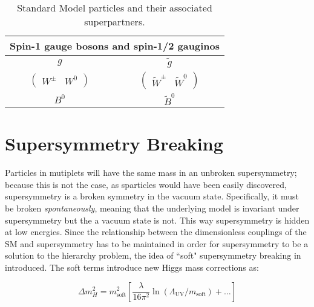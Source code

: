 \begin{table}[!htb]
\begin{tabular}{c|c}
		\hline\hline
		\multicolumn{5}{c}{Spin-1 gauge bosons and spin-1/2 gauginos} \\
		\hline
		$g$											& $\tilde{g}$											\\%
		$\begin{pmatrix} W^{\pm}&W^0\end{pmatrix}$	& $\begin{pmatrix} \widetilde{W}^{\pm}&\widetilde{W}^0\end{pmatrix}$						\\%
		$B^0$											& $\widetilde{B}^0$												\\%
		\hline\hline
	\end{tabular}
	\caption{Standard Model particles and their associated superpartners.}
	\label{tab:smsusypartners}
\end{table}


\section{Supersymmetry Breaking}

Particles in mutiplets will have the same mass in an unbroken supersymmetry; because this is not the case, as sparticles would have been easily discovered, supersymmetry is a broken symmetry in the vacuum state.  Specifically, it must be broken \textit{spontaneously}, meaning that the underlying model is invariant under supersymmetry but the a vacuum state is not.  This way supersymmetry is hidden at low energies.  Since the relationship between the dimensionless couplings of the SM and supersymmetry has to be maintained in order for supersymmetry to be a solution to the hierarchy problem, the idea of ``soft" supersymmetry breaking in introduced.  The soft terms introduce new Higgs mass corrections as\cite{susyprimer}:



\begin{equation}
	\Delta m_H^2 = m_{\mathrm{soft}}^2 \left[ \frac{\lambda}{16\pi^2}\ln(\Lambda_{\mathrm{UV}}/m_{\mathrm{soft}})+\dots \right]
\end{equation}

